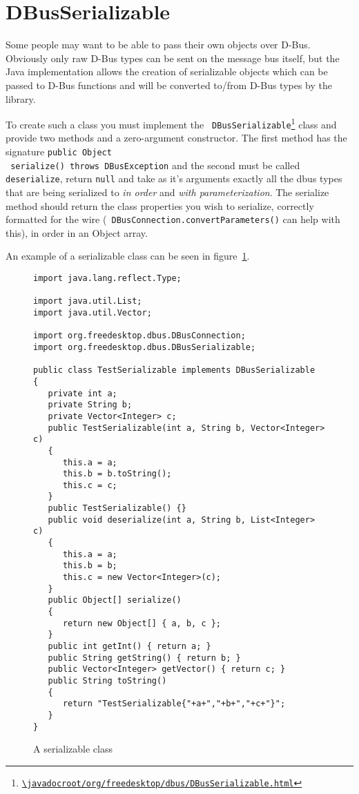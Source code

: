 \documentclass[a4paper,12pt]{article}
\begin{document}
\section{DBusSerializable}

Some people may want to be able to pass their own objects over D-Bus. Obviously
only raw D-Bus types can be sent on the message bus itself, but the Java
implementation allows the creation of serializable objects which can be passed to
D-Bus functions and will be converted to/from D-Bus types by the library.

To create such a class you must implement the {\tt
DBusSerializable\footnote{\url{\javadocroot/org/freedesktop/dbus/DBusSerializable.html}}}
class and provide two methods and a zero-argument constructor. The first method
has the signature {\tt public Object\[\] serialize() throws DBusException} and
the second must be called {\tt deserialize}, return {\tt null} and take as it's
arguments exactly all the dbus types that are being serialized to {\em in
order} and {\em with parameterization}. The serialize method should return the
class properties you wish to serialize, correctly formatted for the wire ({\tt
DBusConnection.convertParameters()} can help with this), in order in an Object
array.

An example of a serializable class can be seen in figure~\ref{fig:serializable}.


\begin{figure}[htb]
\begin{center}
\begin{verbatim}
import java.lang.reflect.Type;

import java.util.List;
import java.util.Vector;

import org.freedesktop.dbus.DBusConnection;
import org.freedesktop.dbus.DBusSerializable;

public class TestSerializable implements DBusSerializable
{
   private int a;
   private String b;
   private Vector<Integer> c;
   public TestSerializable(int a, String b, Vector<Integer> c)
   {
      this.a = a;
      this.b = b.toString();
      this.c = c;
   }
   public TestSerializable() {}
   public void deserialize(int a, String b, List<Integer> c)
   {
      this.a = a;
      this.b = b;
      this.c = new Vector<Integer>(c);
   }
   public Object[] serialize() 
   {
      return new Object[] { a, b, c };
   }
   public int getInt() { return a; }
   public String getString() { return b; }
   public Vector<Integer> getVector() { return c; }
   public String toString()
   {
      return "TestSerializable{"+a+","+b+","+c+"}";
   }
}
\end{verbatim}
\end{center}
\caption{A serializable class}
\label{fig:serializable}
\end{figure}
\end{document}
